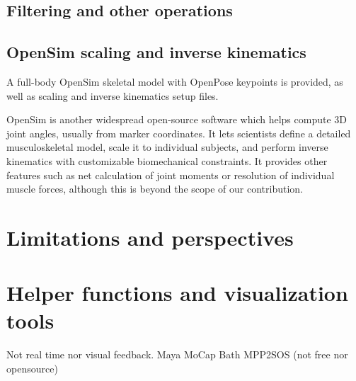 \subsection{Filtering and other operations}


\subsection{OpenSim scaling and inverse kinematics}

A full-body OpenSim \cite{Delp2007,Seth2018} skeletal model with OpenPose keypoints is provided, as well as scaling and inverse kinematics setup files.

OpenSim is another widespread open-source software which helps compute 3D joint angles, usually from marker coordinates. It lets scientists define a detailed musculoskeletal model, scale it to individual subjects, and perform inverse kinematics with customizable biomechanical constraints. It provides other features such as net calculation of joint moments or resolution of individual muscle forces, although this is beyond the scope of our contribution.


\section{Limitations and perspectives}


\section{Helper functions and visualization tools}

Not real time nor visual feedback.
Maya MoCap
Bath
MPP2SOS (not free nor opensource) \cite{Barreto2022}



